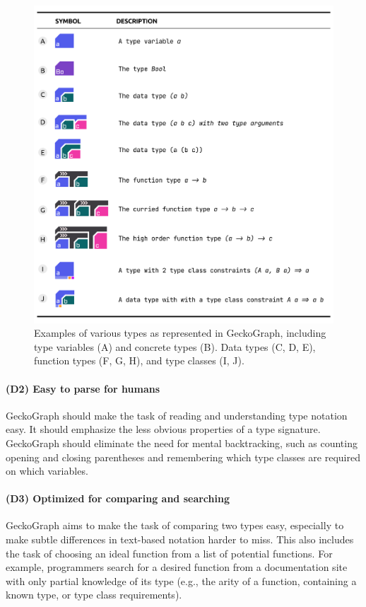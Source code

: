 \documentclass[preprint,12pt]{elsarticle}
\begin{document}
\begin{figure}[!h]
  \includegraphics[width=\linewidth]{figures/Design}
  \caption{
        \label{fig:design}
        Examples of various types as represented in GeckoGraph, including type variables (A) and concrete types (B). Data types (C, D, E), function types (F, G, H), and type classes (I, J).
  }
\end{figure}

\paragraph{\textbf{(D2) Easy to parse for humans}}  \label{goal2} GeckoGraph should make the task of reading and understanding type notation easy. It should emphasize the less obvious properties of a type signature. GeckoGraph should eliminate the need for mental backtracking, such as counting opening and closing parentheses and remembering which type classes are required on which variables. 

\paragraph{\textbf{(D3) Optimized for comparing and searching}} \label{goal3} GeckoGraph aims to make the task of comparing two types easy, especially to make subtle differences in text-based notation harder to miss. This also includes the task of choosing an ideal function from a list of potential functions. For example, programmers search for a desired function from a documentation site with only partial knowledge of its type (e.g., the arity of a function, containing a known type, or type class requirements). 
\end{document}
